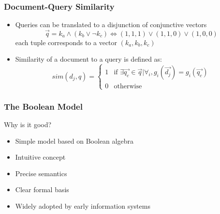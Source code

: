 \documentclass[svgnames]{beamer}
\begin{document}
\begin{frame}
  \frametitle{Document-Query Similarity}

  \begin{block}{}
    \begin{itemize}
    \item Queries can be translated to a disjunction of conjunctive vectors
        \begin{displaymath}
            \vec{q} = k_a \wedge (k_b \vee \neg k_c) \Leftrightarrow
            (1,1,1) \vee (1,1,0) \vee (1,0,0)
        \end{displaymath}
        each tuple corresponds to a vector $(k_a,k_b,k_c)$
    \item Similarity of a document to a query is defined as:
      \small
      \begin{displaymath}
          sim(d_j,q) = \left\{
          \begin{array}{ll}
            1 & \text{if $\exists \vec{q_{c}} \in \vec{q} | \forall_{i}, g_i(\vec{d_j}) = g_i(\vec{q_{c}})$} \\
            0 & \text{otherwise}
          \end{array}\right.
      \end{displaymath}

    \end{itemize}
  \end{block}

\end{frame}





\begin{frame}
  \frametitle{The Boolean Model}

  \begin{block}{Why is it good?}
    \begin{itemize}
    \item Simple model based on Boolean algebra
    \item Intuitive concept
    \item Precise semantics
    \item Clear formal basis
    \item Widely adopted by early information systems
    \end{itemize}
  \end{block}

\end{frame}
\end{document}
